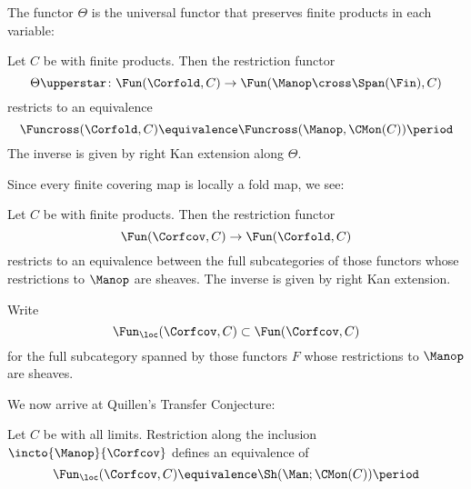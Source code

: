 The functor $ \Theta $ is the universal functor that preserves finite products in each variable:

\begin{proposition}\label{prop:BH.C.5}
	Let $ C $ be \acategory with finite products.
	Then the restriction functor
	\begin{equation*}
		\Theta\upperstar \colon \Fun(\Corfold,C) \to \Fun(\Manop \cross \Span(\Fin), C)
	\end{equation*}
	restricts to an equivalence 
	\begin{equation*}
		\Funcross(\Corfold,C) \equivalence \Funcross(\Manop, \CMon(C)) \period
	\end{equation*}
	The inverse is given by right Kan extension along $ \Theta $.
\end{proposition}

Since every finite covering map is locally a fold map, we see:

\begin{proposition}\label{prop:BH.C.11}
	Let $ C $ be \acategory with finite products.
	Then the restriction functor
	\begin{equation*}
		\Fun(\Corfcov,C) \to \Fun(\Corfold,C) 
	\end{equation*}
	restricts to an equivalence between the full subcategories of those functors whose restrictions to $ \Manop $ are sheaves.
	The inverse is given by right Kan extension.
\end{proposition}

\begin{notation}
	Write
	\begin{equation*}
		\Fun_{\loc}(\Corfcov,C) \subset \Fun(\Corfcov,C)
	\end{equation*}
	for the full subcategory spanned by those functors $ F $ whose restrictions to $ \Manop $ are sheaves.
\end{notation}

We now arrive at Quillen's Transfer Conjecture:

\begin{corollary}\label{cor:transferconjecture}
	Let $ C $ be \acategory with all limits.
	Restriction along the inclusion $ \incto{\Manop}{\Corfcov} $ defines an equivalence of \categories 
	\begin{equation*}
		\Fun_{\loc}(\Corfcov,C) \equivalence \Sh(\Man;\CMon(C)) \period
	\end{equation*}
\end{corollary}

